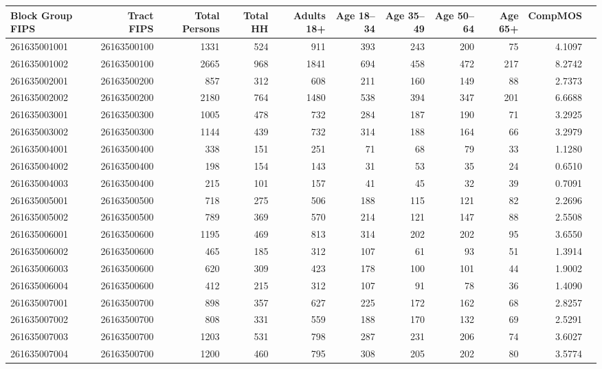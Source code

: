 \documentclass[11pt,landscape]{article}
\begin{document}
{\fontsize{6pt}{7pt}\selectfont
\begin{longtable}[]{@{}lrrrrrrrrrr@{}}
\toprule
\textbf{Block Group FIPS} & \textbf{Tract FIPS} & \textbf{Total Persons} & \textbf{Total HH} & \textbf{Adults 18+} & \textbf{Age 18--34} & \textbf{Age 35--49} & \textbf{Age 50--64} & \textbf{Age 65+} & \textbf{CompMOS} \\
\midrule
\endhead
261635001001 & 26163500100 & 1331 & 524 & 911 & 393 & 243 & 200 & 75 & 4.1097 \\
261635001002 & 26163500100 & 2665 & 968 & 1841 & 694 & 458 & 472 & 217 & 8.2742 \\
261635002001 & 26163500200 & 857 & 312 & 608 & 211 & 160 & 149 & 88 & 2.7373 \\
261635002002 & 26163500200 & 2180 & 764 & 1480 & 538 & 394 & 347 & 201 & 6.6688 \\
261635003001 & 26163500300 & 1005 & 478 & 732 & 284 & 187 & 190 & 71 & 3.2925 \\
261635003002 & 26163500300 & 1144 & 439 & 732 & 314 & 188 & 164 & 66 & 3.2979 \\
261635004001 & 26163500400 & 338 & 151 & 251 & 71 & 68 & 79 & 33 & 1.1280 \\
261635004002 & 26163500400 & 198 & 154 & 143 & 31 & 53 & 35 & 24 & 0.6510 \\
261635004003 & 26163500400 & 215 & 101 & 157 & 41 & 45 & 32 & 39 & 0.7091 \\
261635005001 & 26163500500 & 718 & 275 & 506 & 188 & 115 & 121 & 82 & 2.2696 \\
261635005002 & 26163500500 & 789 & 369 & 570 & 214 & 121 & 147 & 88 & 2.5508 \\
261635006001 & 26163500600 & 1195 & 469 & 813 & 314 & 202 & 202 & 95 & 3.6550 \\
261635006002 & 26163500600 & 465 & 185 & 312 & 107 & 61 & 93 & 51 & 1.3914 \\
261635006003 & 26163500600 & 620 & 309 & 423 & 178 & 100 & 101 & 44 & 1.9002 \\
261635006004 & 26163500600 & 412 & 215 & 312 & 107 & 91 & 78 & 36 & 1.4090 \\
261635007001 & 26163500700 & 898 & 357 & 627 & 225 & 172 & 162 & 68 & 2.8257 \\
261635007002 & 26163500700 & 808 & 331 & 559 & 188 & 170 & 132 & 69 & 2.5291 \\
261635007003 & 26163500700 & 1203 & 531 & 798 & 287 & 231 & 206 & 74 & 3.6027 \\
261635007004 & 26163500700 & 1200 & 460 & 795 & 308 & 205 & 202 & 80 & 3.5774 \\

\end{longtable}}
\end{document}
